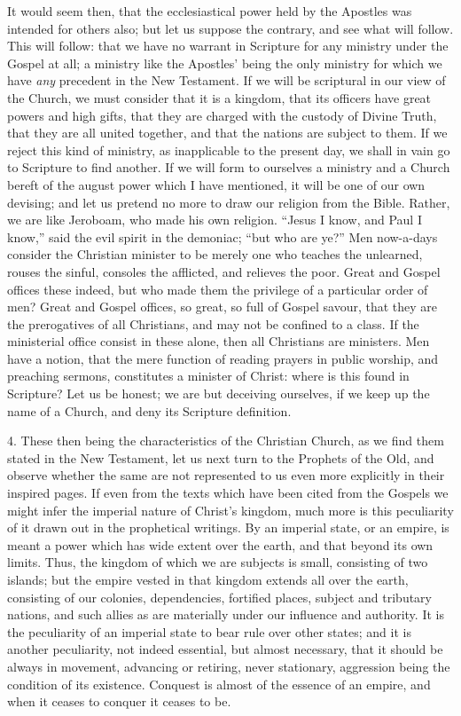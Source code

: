 It would seem then, that the ecclesiastical power held by the
Apostles was intended for others also; but let us suppose the
contrary, and see what will follow. This will follow: that we have no
warrant in Scripture for any ministry under the Gospel at all; a
ministry like the Apostles' being the only ministry for which we have \emph{any}
precedent in the New Testament. If we will be scriptural in our view
of the Church, we must consider that it is a kingdom, that its
officers have great powers and high gifts, that they are charged with
the custody of Divine Truth, that they are all united together, and
that the nations are subject to them. If we reject this kind of
ministry, as inapplicable to the present day, we shall in vain go to
Scripture to find another. If we will form to ourselves a ministry and
a Church bereft of the august power which I have mentioned, it will be
one of our own devising; and let us pretend no more to draw our
religion from the Bible. Rather, we are like Jeroboam, who made his
own religion. ``Jesus I know, and Paul I know,'' said the evil
spirit in the demoniac; ``but who are ye?'' Men now-a-days
consider the Christian minister to be merely one who teaches the
unlearned, rouses the sinful, consoles the afflicted, and relieves the
poor. Great and Gospel offices these indeed, but who made them the
privilege of a particular order of men? Great and Gospel offices, so
great, so full of Gospel savour, that they are the prerogatives of all
Christians, and may not be confined to a class. If the ministerial
office consist in these alone, then all Christians are ministers. Men
have a notion, that the mere function of reading prayers in public
worship, and preaching sermons, constitutes a minister of Christ:
where is this found in Scripture? Let us be honest; we are but
deceiving ourselves, if we keep up the name of a Church, and deny its
Scripture definition.

4. These then being the characteristics of the Christian Church, as
we find them stated in the New Testament, let us next turn to the
Prophets of the Old, and observe whether the same are not represented
to us even more explicitly in their inspired pages. If even from the
texts which have been cited from the Gospels we might infer the
imperial nature of Christ's kingdom, much more is this peculiarity of
it drawn out in the prophetical writings. By an imperial state, or an
empire, is meant a power which has wide extent over the earth, and
that beyond its own limits. Thus, the kingdom of which we are subjects
is small, consisting of two islands; but the empire vested in that
kingdom extends all over the earth, consisting of our colonies,
dependencies, fortified places, subject and tributary nations, and
such allies as are materially under our influence and authority. It is
the peculiarity of an imperial state to bear rule over other states;
and it is another peculiarity, not indeed essential, but almost
necessary, that it should be always in movement, advancing or
retiring, never stationary, aggression being the condition of its
existence. Conquest is almost of the essence of an empire, and when it
ceases to conquer it ceases to be.


